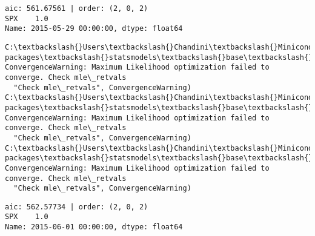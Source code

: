 \documentclass[11pt]{article}
\begin{document}
    \begin{Verbatim}[commandchars=\\\{\}]
aic: 561.67561 | order: (2, 0, 2)
SPX    1.0
Name: 2015-05-29 00:00:00, dtype: float64

    \end{Verbatim}

    \begin{Verbatim}[commandchars=\\\{\}]
C:\textbackslash{}Users\textbackslash{}Chandini\textbackslash{}Miniconda3\textbackslash{}envs\textbackslash{}auquan\textbackslash{}lib\textbackslash{}site-packages\textbackslash{}statsmodels\textbackslash{}base\textbackslash{}model.py:496: ConvergenceWarning: Maximum Likelihood optimization failed to converge. Check mle\_retvals
  "Check mle\_retvals", ConvergenceWarning)
C:\textbackslash{}Users\textbackslash{}Chandini\textbackslash{}Miniconda3\textbackslash{}envs\textbackslash{}auquan\textbackslash{}lib\textbackslash{}site-packages\textbackslash{}statsmodels\textbackslash{}base\textbackslash{}model.py:496: ConvergenceWarning: Maximum Likelihood optimization failed to converge. Check mle\_retvals
  "Check mle\_retvals", ConvergenceWarning)
C:\textbackslash{}Users\textbackslash{}Chandini\textbackslash{}Miniconda3\textbackslash{}envs\textbackslash{}auquan\textbackslash{}lib\textbackslash{}site-packages\textbackslash{}statsmodels\textbackslash{}base\textbackslash{}model.py:496: ConvergenceWarning: Maximum Likelihood optimization failed to converge. Check mle\_retvals
  "Check mle\_retvals", ConvergenceWarning)

    \end{Verbatim}

    \begin{Verbatim}[commandchars=\\\{\}]
aic: 562.57734 | order: (2, 0, 2)
SPX    1.0
Name: 2015-06-01 00:00:00, dtype: float64

    \end{Verbatim}
\end{document}
